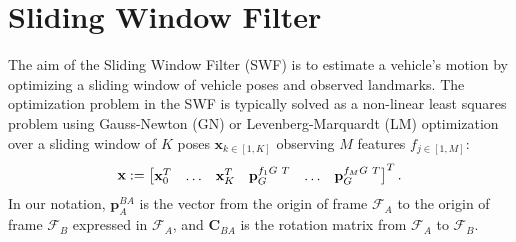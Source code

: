 \documentclass[letterpaper, 10 pt, conference]{ieeeconf}  %
\def\Vec#1{\mathbf{#1}}
\newcommand{\bbm}{\begin{bmatrix}}
\newcommand{\ebm}{\end{bmatrix}}
\begin{document}
\section{Sliding Window Filter} \label{sec:SWF}
The aim of the Sliding Window Filter (SWF) is to estimate a vehicle's motion by optimizing a sliding window of vehicle poses and observed landmarks.
The optimization problem in the SWF is typically solved as a non-linear least squares problem using Gauss-Newton (GN) or Levenberg-Marquardt (LM) optimization over a sliding window of $K$ poses $\Vec x_{k\in[1,K]}$ observing $M$ features $f_{j\in[1,M]}$: 
\begin{equation}
\Vec{x} := \bbm \Vec x_0^T & \hdots & \Vec x_K^T & {\Vec {p}_G^{f_1G \hspace{0.3em} T}} & \hdots & {\Vec {p}_G^{f_MG \hspace{0.3em} T}} \ebm ^T.
\end{equation}
In our notation, $\Vec p^{BA}_A$ is the vector from the origin of frame $\mathcal{F}_A$ to the origin of frame $\mathcal{F}_B$ expressed in $\mathcal{F}_A$, and $\Vec C_{BA}$ is the rotation matrix from $\mathcal{F}_A$ to $\mathcal{F}_B$.
\end{document}

